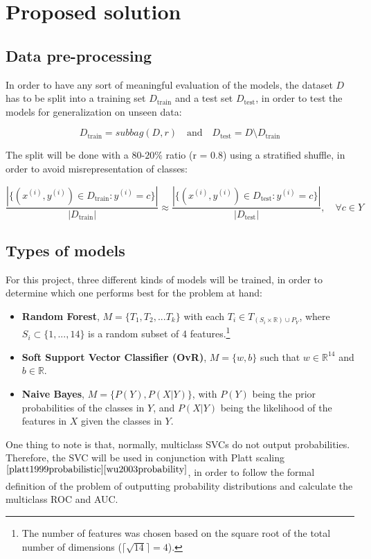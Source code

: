 \documentclass{article}
\begin{document}
\section{Proposed solution}
\subsection{Data pre-processing}
In order to have any sort of meaningful evaluation of the models, the dataset $D$ has to be split into a training set $D_{\text{train}}$ and a test set $D_{\text{test}}$, 
in order to test the models for generalization on unseen data:

\begin{equation*}
    D_{\text{train}} = subbag(D, r) \quad \text{and} \quad D_{\text{test}} = D \setminus D_{\text{train}}
\end{equation*}

The split will be done with a $80$-$20\%$ ratio (r = 0.8) using a stratified shuffle, in order to avoid misrepresentation of classes:

\begin{equation*}
    \frac
        {|\{(x^{(i)}, y^{(i)}) \in D_{\text{train}} : y^{(i)} = c\}|}
        {|D_{\text{train}}|}
    \approx 
    \frac
        {|\{(x^{(i)}, y^{(i)}) \in D_{\text{test}} : y^{(i)} = c\}|}
        {|D_{\text{test}}|},
    \quad \forall c \in Y
\end{equation*}

\subsection{Types of models}
For this project, three different kinds of models will be trained, in order to determine which one performs best for the problem at hand:
\begin{itemize}
    \item \textbf{Random Forest}, $M = \{T_1, T_2,... T_k\}$ with each $T_i \in T_{(S_i \times \mathbb{R}) \cup P_{Y}}$, where $S_i \subset \{1,...,14\}$ is a random subset of 4 features.\footnote{The number of features was chosen based on the square root of the total number of dimensions ($\lceil\sqrt{14}\rceil = 4$).}
    \item \textbf{Soft Support Vector Classifier (OvR)}, $M = \{w, b\}$ such that $w \in \mathbb{R}^{14}$ and $b \in \mathbb{R}$.
    \item \textbf{Naive Bayes}, $M = \{P(Y), P(X|Y)\}$, with $P(Y)$ being the prior probabilities of the classes in $Y$, and $P(X|Y)$ being the likelihood of the features in $X$ given the classes in $Y$.
\end{itemize}
One thing to note is that, normally, multiclass SVCs do not output probabilities.
Therefore, the SVC will be used in conjunction with Platt scaling$^{\cite{platt1999probabilistic}\cite{wu2003probability}}$, in order to follow the formal definition of the problem of outputting probability distributions and calculate the multiclass ROC and AUC.
\end{document}
